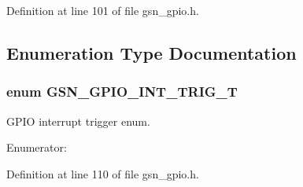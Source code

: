 Definition at line 101 of file gsn\_\-gpio.h.



\subsection{Enumeration Type Documentation}
\hypertarget{a00648_gaff716caaf31f66ce12b16f91bb47c06a}{
\subsubsection[{GSN\_\-GPIO\_\-INT\_\-TRIG\_\-T}]{\setlength{\rightskip}{0pt plus 5cm}enum {\bf GSN\_\-GPIO\_\-INT\_\-TRIG\_\-T}}}
\label{a00648_gaff716caaf31f66ce12b16f91bb47c06a}


GPIO interrupt trigger enum. 

\begin{Desc}
\item[Enumerator: ]\par
\begin{description}
\item[{\em 
\hypertarget{a00648_ggaff716caaf31f66ce12b16f91bb47c06aa52a5bb11ea0fbbaeb8c0328e374c2170}{
GSN\_\-GPIO\_\-INT\_\-PE\_\-TRIG}
\label{a00648_ggaff716caaf31f66ce12b16f91bb47c06aa52a5bb11ea0fbbaeb8c0328e374c2170}
}]\item[{\em 
\hypertarget{a00648_ggaff716caaf31f66ce12b16f91bb47c06aa82a5e5bf12f8a3a17cd11b729b845b7c}{
GSN\_\-GPIO\_\-INT\_\-NE\_\-TRIG}
\label{a00648_ggaff716caaf31f66ce12b16f91bb47c06aa82a5e5bf12f8a3a17cd11b729b845b7c}
}]\end{description}
\end{Desc}



Definition at line 110 of file gsn\_\-gpio.h.



